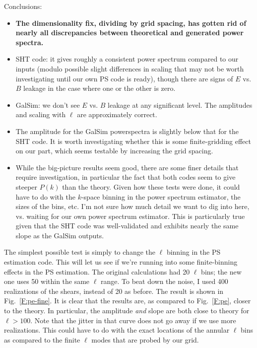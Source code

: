 \documentclass[preprint]{aastex}
\begin{document}
Conclusions:
\begin{itemize}
\item \textbf{The dimensionality fix, dividing by grid spacing, has
    gotten rid of nearly all discrepancies between theoretical and
    generated power spectra.}
\item SHT code: it gives roughly a consistent power spectrum compared
  to our inputs (modulo possible slight differences in scaling that
  may not be worth investigating until our own PS code is ready),
  though there are signs of $E$ vs. $B$ leakage in the case where one
  or the other is zero.
\item GalSim: we don't see $E$ vs. $B$ leakage at any significant
  level.  The amplitudes and scaling with $\ell$ are approximately
  correct.
\item The amplitude for the GalSim powerspectra is slightly below that
  for the SHT code.  It is worth investigating whether this is some
  finite-gridding effect on our part, which seems testable by
  increasing the grid spacing.
\item While the big-picture results seem good, there are some finer
  details that require investigation, in particular the fact that both
  codes seem to give steeper $P(k)$ than the theory.  Given how these
  tests were done, it could have to do with the $k$-space binning in
  the power spectrum estimator, the sizes of the bins, etc.  I'm not sure how much detail we want
  to dig into here, vs. waiting for our own power spectrum estimator.
  This is particularly true given that the SHT code was well-validated
  and exhibits nearly the same slope as the GalSim outputs.
\end{itemize}

The simplest possible test is simply to change the $\ell$ binning in
the PS estimation code.  This will let us see if we're running into
some finite-binning effects in the PS estimation.  The original
calculations had 20 $\ell$ bins; the new one uses 50 within the same
$\ell$ range.  To beat down the noise, I used 400 realizations of the
shears, instead of 20 as before.  The result is shown in
Fig.~\ref{F:pe-fine}.  It is clear that the results are, as compared
to Fig.~\ref{F:pe}, closer to the theory.  In particular, the
amplitude {\em and} slope are both close to theory for $\ell>100$.
Note that the jitter in that curve does not go away if we use more
realizations.  This could have to do with the exact locations of the
annular $\ell$ bins as compared to the finite $\ell$ modes that are
probed by our grid.  
\end{document}

